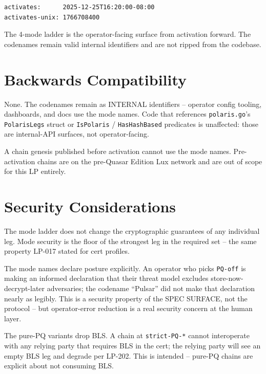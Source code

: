 \begin{verbatim}
activates:      2025-12-25T16:20:00-08:00
activates-unix: 1766708400
\end{verbatim}

The 4-mode ladder is the operator-facing surface from activation
forward. The codenames remain valid internal identifiers and are
not ripped from the codebase.

\section{Backwards Compatibility}

None. The codenames remain as INTERNAL identifiers --
operator config tooling, dashboards, and docs use the mode
names. Code that references \texttt{polaris.go}'s
\texttt{PolarisLegs} struct or \texttt{IsPolaris} /
\texttt{HasHashBased} predicates is unaffected: those are
internal-API surfaces, not operator-facing.

A chain genesis published before activation cannot use the mode
names. Pre-activation chains are on the pre-Quasar Edition Lux
network and are out of scope for this LP entirely.

\section{Security Considerations}

The mode ladder does not change the cryptographic guarantees of any
individual leg. Mode security is the floor of the strongest leg in
the required set -- the same property LP-017 stated for cert
profiles.

The mode names declare posture explicitly. An operator who picks
\texttt{PQ-off} is making an informed declaration that their
threat model excludes store-now-decrypt-later adversaries; the
codename ``Pulsar'' did not make that declaration nearly as
legibly. This is a security property of the SPEC SURFACE, not the
protocol -- but operator-error reduction is a real security
concern at the human layer.

The pure-PQ variants drop BLS. A chain at \texttt{strict-PQ-*}
cannot interoperate with any relying party that requires BLS in
the cert; the relying party will see an empty BLS leg and degrade
per LP-202. This is intended -- pure-PQ chains are explicit about
not consuming BLS.
